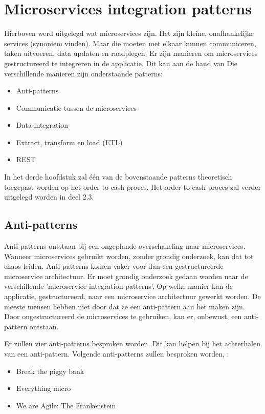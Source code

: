 \section{Microservices integration patterns}
Hierboven werd uitgelegd wat microservices zijn. Het zijn kleine, onafhankelijke services (synoniem vinden). Maar die moeten met elkaar kunnen communiceren, taken uitvoeren, data updaten en raadplegen. Er zijn manieren om microservices gestructureerd te integreren in de applicatie. Dit kan aan de hand van 
Die verschillende manieren zijn onderstaande patterns:
\begin{itemize}
	\item Anti-patterns
	\item Communicatie tussen de microservices
	\item Data integration
	\item Extract, transform en load (ETL)
	\item REST	
\end{itemize}

In het derde hoofdstuk zal één van de bovenstaande patterns theoretisch toegepast worden op het order-to-cash proces. Het order-to-cash proces zal verder uitgelegd worden in deel 2.3.
\subsection{Anti-patterns}
Anti-patterns ontstaan bij een ongeplande overschakeling naar microservices. Wanneer microservices gebruikt worden, zonder grondig onderzoek, kan dat tot chaos leiden. Anti-patterns komen vaker voor dan een gestructureerde microservice architectuur. Er moet grondig onderzoek gedaan worden naar de verschillende 'microservice integration patterns'. Op welke manier kan de applicatie, gestructureerd, naar een microservice architectuur gewerkt worden.
De meeste mensen hebben niet door dat ze een anti-pattern aan het maken zijn. Door ongestructureerd de microservices te gebruiken, kan er, onbewust, een anti-pattern ontstaan. 

Er zullen vier anti-patterns besproken worden. Dit kan helpen bij het achterhalen van een anti-pattern. Volgende anti-patterns zullen besproken worden, \textcite{Monson2019}:
\begin{itemize}
	\item Break the piggy bank
	\item Everything micro
	\item We are Agile: The Frankenstein
\end{itemize}
